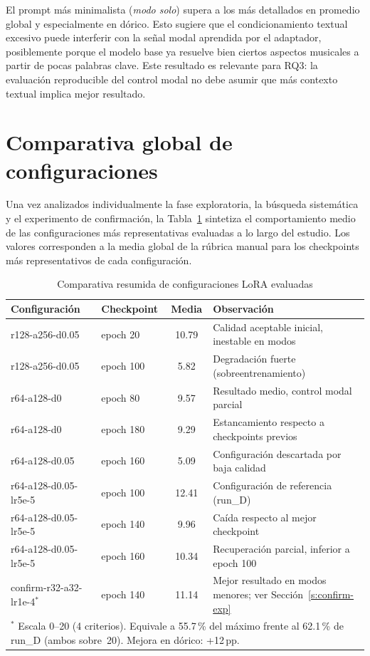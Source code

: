 \documentclass[%
    school=etsisi,%
    type=pfg,%
    degree=61CD,%
]{upm-report}
\begin{document}
El prompt m\'as minimalista (\textit{modo solo}) supera a los m\'as detallados en promedio global y especialmente en d\'orico. Esto sugiere que el condicionamiento textual excesivo puede interferir con la se\~nal modal aprendida por el adaptador, posiblemente porque el modelo base ya resuelve bien ciertos aspectos musicales a partir de pocas palabras clave. Este resultado es relevante para RQ3: la evaluaci\'on reproducible del control modal no debe asumir que m\'as contexto textual implica mejor resultado.

\section{Comparativa global de configuraciones}
\label{s:comparativa-global}

Una vez analizados individualmente la fase exploratoria, la b\'usqueda sistem\'atica y el experimento de confirmaci\'on, la Tabla~\ref{tab:comparativa-runs} sintetiza el comportamiento medio de las configuraciones m\'as representativas evaluadas a lo largo del estudio. Los valores corresponden a la media global de la r\'ubrica manual para los checkpoints m\'as representativos de cada configuraci\'on.

\begin{table}[H]
    \centering
    \caption{Comparativa resumida de configuraciones LoRA evaluadas}
    \label{tab:comparativa-runs}
    \small
    \begin{tabular}{p{3.8cm}lcp{4.8cm}}
        \toprule
        \textbf{Configuraci\'on} & \textbf{Checkpoint} & \textbf{Media} & \textbf{Observaci\'on} \\
        \midrule
        r128-a256-d0.05 & epoch 20  & 10.79 & Calidad aceptable inicial, inestable en modos \\
        r128-a256-d0.05 & epoch 100 & 5.82  & Degradaci\'on fuerte (sobreentrenamiento) \\
        r64-a128-d0     & epoch 80  & 9.57  & Resultado medio, control modal parcial \\
        r64-a128-d0     & epoch 180 & 9.29  & Estancamiento respecto a checkpoints previos \\
        r64-a128-d0.05  & epoch 160 & 5.09  & Configuraci\'on descartada por baja calidad \\
        r64-a128-d0.05-lr5e-5 & epoch 100 & 12.41 & Configuraci\'on de referencia (run\_D) \\
        r64-a128-d0.05-lr5e-5 & epoch 140 & 9.96  & Ca\'ida respecto al mejor checkpoint \\
        r64-a128-d0.05-lr5e-5 & epoch 160 & 10.34 & Recuperaci\'on parcial, inferior a epoch 100 \\
        \midrule
        confirm-r32-a32-lr1e-4$^{*}$ & epoch 140 & 11.14 & Mejor resultado en modos menores; ver Secci\'on~\ref{s:confirm-exp} \\
        \bottomrule
        \multicolumn{4}{p{13cm}}{$^{*}$ Escala 0--20 (4 criterios). Equivale a 55.7\,\% del m\'aximo frente al 62.1\,\% de run\_D (ambos sobre~20). Mejora en d\'orico: +12\,pp.}
    \end{tabular}
\end{table}
\end{document}
